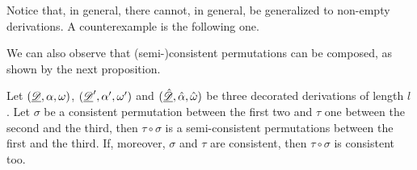 \begin{example}Notice that, in general, there cannot, in general, be generalized to non-empty derivations. A counterexample is the following one.
\end{example}



We can also observe that (semi-)consistent permutations can be composed, as shown by the next proposition.

\begin{proposition}\label{rem:comp}  Let $(\underline{\mathscr{D}}, \alpha, \omega)$, $(\underline{\mathscr{D}}', \alpha', \omega')$ and $(\underline{\mathscr{\hat{D}}}, \hat{\alpha}, \hat{\omega})$ be three decorated derivations of length $l$. Let $\sigma$ be a consistent permutation between the first two and $\tau$ one between the second and the third, then $\tau \circ \sigma$ is a semi-consistent permutations between the first and the third. If, moreover, $\sigma$ and $\tau$ are consistent, then $\tau \circ \sigma$ is consistent too.
\end{proposition} 	


